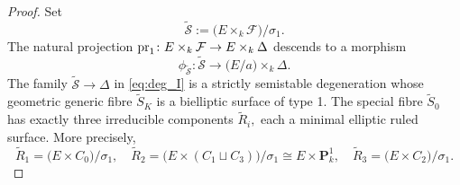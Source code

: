 \documentclass[11pt,letterpaper]{amsart}
\newcommand{\pr}{\textnormal{pr}}
\newcommand{\ca}[1]{{\mathcal{#1}}}
\numberwithin{equation}{section}
\theoremstyle{definition}
\theoremstyle{remark}
\newcommand{\bbP}{\mathbf{P}}
\begin{document}
\begin{proof}
Set \begin{equation}\label{eq:deg_I}
\widetilde{\ca S}:=\bigl(E\times_{k}\ca F\bigr)/\sigma_{1}.\end{equation} The natural projection $\pr_{1}\colon E\times_{k}\ca F\to E\times_{k}\Delta$ descends to a morphism \begin{equation}\label{eq:albanese_I}\phi_{\widetilde{\ca S}}\colon \widetilde{\ca S}\longrightarrow \bigl(E/a\bigr)\times_{k}\Delta .\end{equation}
The family $\widetilde{\ca S}\to \Delta$ in \eqref{eq:deg_I} is a strictly semistable degeneration whose geometric generic fibre $\widetilde{S}_{K}$ is a bielliptic surface of type 1. The special fibre $\widetilde{S}_{0}$ has exactly three irreducible components $\widetilde{R}_{i},$ each a minimal elliptic ruled surface. More precisely, 
\begin{equation}\label{eq:components_I}
\widetilde{R}_{1} = \bigl(E \times C_0\bigr)/\sigma_1,\quad
\widetilde{R}_{2} =\bigl( E \times (C_1 \sqcup C_3)\bigr)/\sigma_1 \cong E \times \bbP^1_k,\quad
\widetilde{R}_{3} = \bigl(E \times C_2\bigr)/\sigma_1 .
\end{equation}


\end{proof}
\end{document}
